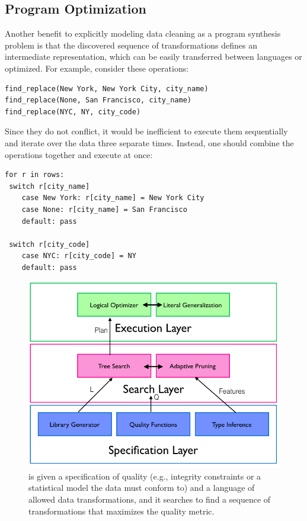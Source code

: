 \subsection{Program Optimization}
Another benefit to explicitly modeling data cleaning as a program synthesis problem is that the discovered sequence of transformations defines an intermediate
representation, which can be easily transferred between languages or optimized.
For example, consider these operations:
\begin{lstlisting}
find_replace(New York, New York City, city_name)
find_replace(None, San Francisco, city_name)
find_replace(NYC, NY, city_code)
\end{lstlisting}
Since they do not conflict, it would be inefficient to execute them sequentially and iterate over the data three separate times.
Instead, one should combine the operations together and execute at once:
\begin{lstlisting}
for r in rows:
 switch r[city_name]
    case New York: r[city_name] = New York City
    case None: r[city_name] = San Francisco
    default: pass
    
 switch r[city_code]
    case NYC: r[city_code] = NY
    default: pass
\end{lstlisting}


\begin{figure}[t]
\centering
 \includegraphics[width=\columnwidth]{figures/alphacleanarch.png}
 \caption{ \sys is given a specification of quality (e.g., integrity constraints or a statistical model the data must conform to) and a language  of  allowed  data  transformations,  and  it  searches  to find a sequence of transformations that maximizes the quality metric. }
\end{figure}









